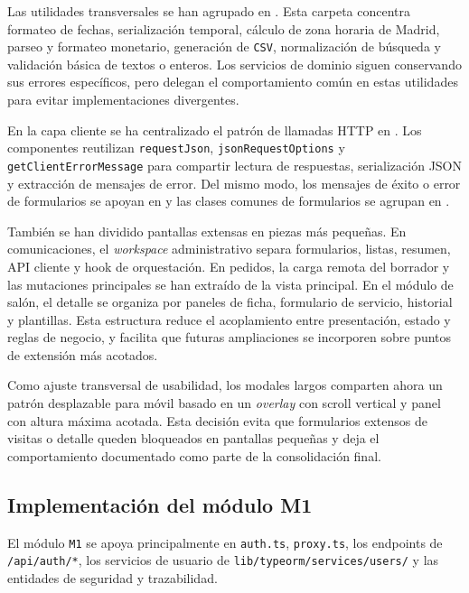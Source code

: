 Las utilidades transversales se han agrupado en . Esta carpeta concentra formateo de fechas, serialización temporal, cálculo de zona horaria de Madrid, parseo y formateo monetario, generación de \texttt{CSV}, normalización de búsqueda y validación básica de textos o enteros. Los servicios de dominio siguen conservando sus errores específicos, pero delegan el comportamiento común en estas utilidades para evitar implementaciones divergentes.

En la capa cliente se ha centralizado el patrón de llamadas HTTP en . Los componentes reutilizan \texttt{requestJson}, \texttt{jsonRequestOptions} y \texttt{getClientErrorMessage} para compartir lectura de respuestas, serialización JSON y extracción de mensajes de error. Del mismo modo, los mensajes de éxito o error de formularios se apoyan en  y las clases comunes de formularios se agrupan en .

También se han dividido pantallas extensas en piezas más pequeñas. En comunicaciones, el \textit{workspace} administrativo separa formularios, listas, resumen, API cliente y hook de orquestación. En pedidos, la carga remota del borrador y las mutaciones principales se han extraído de la vista principal. En el módulo de salón, el detalle se organiza por paneles de ficha, formulario de servicio, historial y plantillas. Esta estructura reduce el acoplamiento entre presentación, estado y reglas de negocio, y facilita que futuras ampliaciones se incorporen sobre puntos de extensión más acotados.

Como ajuste transversal de usabilidad, los modales largos comparten ahora un patrón desplazable para móvil basado en un \textit{overlay} con scroll vertical y panel con altura máxima acotada. Esta decisión evita que formularios extensos de visitas o detalle queden bloqueados en pantallas pequeñas y deja el comportamiento documentado como parte de la consolidación final.



\subsection{Implementación del módulo M1}

El módulo \texttt{M1} se apoya principalmente en \texttt{auth.ts}, \texttt{proxy.ts}, los endpoints de \texttt{/api/auth/*}, los servicios de usuario de \texttt{lib/typeorm/services/users/} y las entidades de seguridad y trazabilidad.

